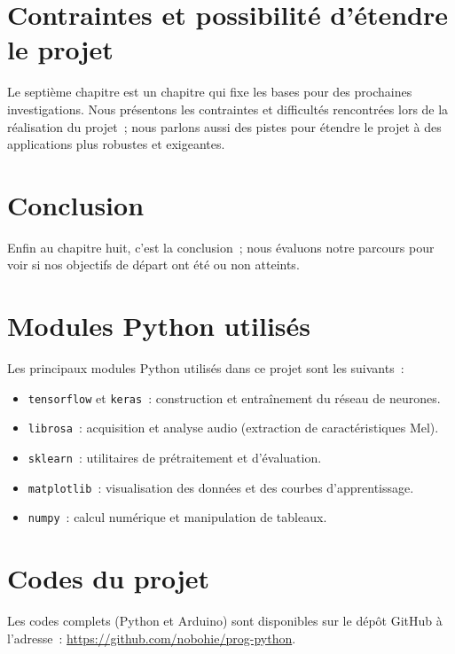 \documentclass[a4paper,12pt,twoside]{report}
\theoremstyle{definition}
\theoremstyle{plain}
\theoremstyle{remark}
\begin{document}
\chapter{Contraintes et possibilité d'étendre le projet}
\label{chap:contraintes}


Le septième chapitre est un chapitre qui fixe les bases pour des prochaines investigations.
Nous présentons les contraintes et difficultés rencontrées lors de la réalisation du
projet~; nous parlons aussi des pistes pour étendre le projet à des applications plus
robustes et exigeantes.

\chapter{Conclusion}
\label{chap:conclusion}


Enfin au chapitre huit, c'est la conclusion~; nous évaluons notre parcours pour voir si nos
objectifs de départ ont été ou non atteints.

\appendix

\chapter{Modules Python utilisés}

Les principaux modules Python utilisés dans ce projet sont les suivants~:
\begin{itemize}
	\item \texttt{tensorflow} et \texttt{keras}~: construction et entraînement du réseau
	      de neurones.
	\item \texttt{librosa}~: acquisition et analyse audio (extraction de caractéristiques
	      Mel).
	\item \texttt{sklearn}~: utilitaires de prétraitement et d'évaluation.
	\item \texttt{matplotlib}~: visualisation des données et des courbes d'apprentissage.
	\item \texttt{numpy}~: calcul numérique et manipulation de tableaux.
\end{itemize}

\chapter{Codes du projet}

Les codes complets (Python et Arduino) sont disponibles sur le dépôt GitHub à
l'adresse~: \url{https://github.com/nobohie/prog-python}.



\end{document}
